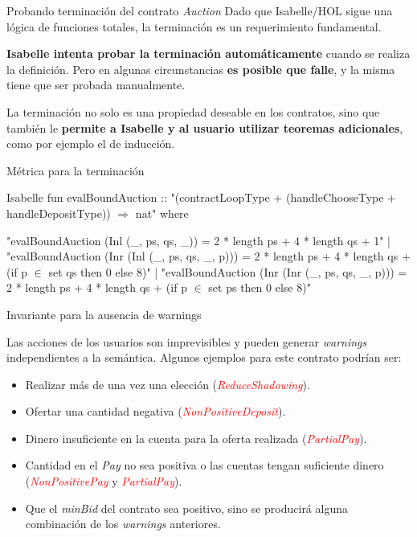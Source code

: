 \documentclass{beamer}
\begin{document}
\begin{frame}{Probando terminación del contrato \textit{Auction}}
Dado que Isabelle/HOL sigue una lógica de funciones totales, la terminación es un requerimiento fundamental. 

\vfill

\textbf{Isabelle intenta probar la terminación automáticamente} cuando se realiza la definición. Pero en algunas circunstancias \textbf{es posible que falle}, y la misma tiene que ser probada manualmente.

\vfill
\pause

La terminación no solo es una propiedad deseable en los contratos, sino que también le \textbf{permite a Isabelle y al usuario utilizar teoremas adicionales}, como por ejemplo el de inducción.

\end{frame}

\begin{frame}[fragile]{Métrica para la terminación}
\begin{code}{Isabelle}
fun evalBoundAuction :: "(contractLoopType + (handleChooseType + handleDepositType)) $\Rightarrow$ nat" where

"evalBoundAuction (Inl (_, ps, qs, _)) =
        2 * length ps + 4 * length qs + 1" |
"evalBoundAuction (Inr (Inl (_, ps, qs, _, p))) =
        2 * length ps + 4 * length qs + (if p $\in$ set qs then 0 else 8)" |
"evalBoundAuction (Inr (Inr (_, ps, qs, _, p))) =
        2 * length ps + 4 * length qs + (if p $\in$ set ps then 0 else 8)"
\end{code}

\end{frame}


\begin{frame}{Invariante para la ausencia de warnings}

Las acciones de los usuarios son imprevisibles y pueden generar \textit{warnings} independientes a la semántica. Algunos ejemplos para este contrato podrían ser:
\vfill

   \begin{itemize}
           \pause
       \item Realizar más de una vez una elección (\textcolor{red}{\textit{ReduceShadowing}}).
           \pause
       \item Ofertar una cantidad negativa (\textcolor{red}{\textit{NonPositiveDeposit}}).
           \pause
       \item Dinero insuficiente en la cuenta para la oferta realizada (\textcolor{red}{\textit{PartialPay}}).
           \pause
       \item Cantidad en el \textit{Pay} no sea positiva o las cuentas tengan suficiente dinero (\textcolor{red}{\textit{NonPositivePay}} y \textcolor{red}{\textit{PartialPay}}).
           \pause
       \item Que el \textit{minBid} del contrato sea positivo, sino se producirá alguna combinación de los \textit{warnings} anteriores.
   \end{itemize} 

\end{frame}
\end{document}

